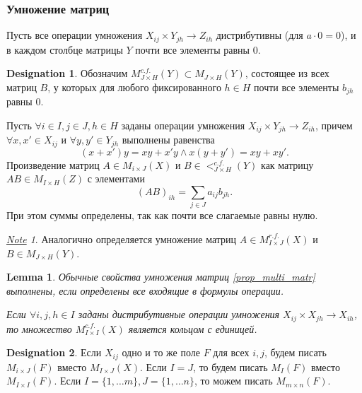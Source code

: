 \documentclass[11pt]{book}
\theoremstyle{definition}
\theoremstyle{plain}
\theoremstyle{plain}
\newtheorem{lm}{Lemma}
\theoremstyle{definition}
\newtheorem*{name}{Designation}
\theoremstyle{remark}
\newtheorem*{note}{\underline{Note}}
\begin{document}
\subsubsection{Умножение матриц}
Пусть все операции умножения  $ X_{ij}\times Y_{jh} \to Z_{ih}$ дистрибутивны (для $ a \cdot 0 = 0$), и в каждом столбце матрицы $ Y$ почти все элементы равны 0.
\begin{name}
    Обозначим $ M_{J\times H}^{c.f.}(Y) \subset M_{J\times H}(Y)$, состоящее из всех матриц $ B$, у которых для любого фиксированного  $ h \in H$ почти все элементы $ b_{jh}$ равны 0.
\end{name}
\begin{defn}
    Пусть $ \forall i \in I, j \in J, h \in H$ заданы операции умножения $ X_{ij} \times Y_{jh} \to  Z_{ih}$, причем $ \forall  x, x' \in X_{ij}$ и $ \forall y, y' \in Y_{jh}$ выполнены равенства
    \[
	(x+x')y = xy + x'y \wedge x(y + y') = xy + xy'
    .\]
    Произведение матриц $ A \in M_{i \times J}(X)$  и $ B \in <_{J\times H}^{c.f.}(Y)$ как матрицу $ AB \in M_{I \times H}(Z)$ с элементами
    \[
	(AB)_{ih} = \sum_{j \in J}a_{ij}b_{jh}
    .\]
    При этом суммы определены, так как почти все слагаемые равны нулю.
\end{defn}
\begin{note}
    Аналогично определяется умножение матриц $ A \in M_{I \times J}^{r.f.}(X)$ и $ B \in M_{J \times H}(Y)$.
\end{note}
\begin{lm}
    Обычные свойства умножения матриц \ref{prop_multi_matr} выполнены, если определены все входящие в формулы операции.

    Если $ \forall i, j, h \in I$ заданы дистрибутивные операции умножения $ X_{ij} \times X_{jh} \to  X_{ih}$, то множество $ M_{I \times I}^{c.f.}(X)$ является кольцом с единицей.
\end{lm}
\begin{name}
    Если $ X_{ij}$ одно и то же поле $ F$ для всех  $ i, j$, будем писать  $ M_{i\times J}(F)$ вместо $ M_{I\times J} (X)$. Если $ I = J$, то будем писать  $ M_{I}(F)$ вместо $ M_{I \times I}(F)$. Если $ I = \{1, \ldots m\}, J= \{1, \ldots n\}$, то можем писать $ M_{m \times n}(F)$.
\end{name}
\end{document}
